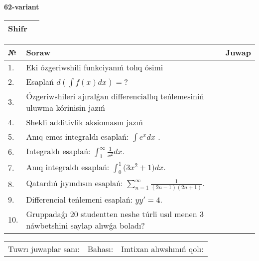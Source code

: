 \documentclass{article}
\begin{document}
  \egroup
  
  \newpage
  
  
  \textbf{62-variant}\\
  
  \bgroup
  \def\arraystretch{1.6} %
  
  \begin{tabular}{|m{5.7cm}|m{9.5cm}|}
  \hline
  Shifr & \\
  \hline
  \end{tabular}
  
  \vspace{1cm}
  
  \begin{tabular}{|m{0.7cm}|m{10cm}|m{4cm}|}
  \hline
  № & Soraw & Juwap \\
  \hline
  1. & Eki ózgeriwshili funkciyanıń tolıq ósimi &  \\
  \hline
  2. & Esaplań \(d\left( \int{f(x)dx} \right) = ?\) &  \\
  \hline
  3. & Ózgeriwshileri ajıralǵan differenciallıq teńlemesiniń uluwma kórinisin jazıń &  \\
  \hline
  4. & Shekli additivlik aksiomasın jazıń &  \\
  \hline
  5. & Anıq emes integraldı esaplań: \(\int{e^{x}dx}\) . &  \\
  \hline
  6. & Integraldı esaplań: \(\int_{1}^{\infty}{\frac{1}{x^2 }dx}\). &  \\
  \hline
  7. & Anıq integraldı esaplań: \(\int_{0}^{1}{(3x^2 } + 1)dx\). &  \\
  \hline
  8. & Qatardıń jıyındısın esaplań: \(\sum_{n = 1}^{\infty}\frac{1}{(2n - 1)(2n + 1)}\). &  \\
  \hline
  9. & Differencial teńlemeni esaplań: \(yy' = 4\). &  \\
  \hline
  10. & Gruppadaǵı 20 studentten neshe túrli usıl menen 3 náwbetshini saylap alıwǵa boladı? &  \\
  \hline
  \end{tabular}
  
  \vspace{1cm}
  
  \begin{tabular}{lll}
  Tuwrı juwaplar sanı: \underline{\hspace{1.5cm}} & 
  Bahası: \underline{\hspace{1.5cm}} & 
  Imtixan alıwshınıń qolı: \underline{\hspace{2cm}} \\
  \end{tabular}
  
\end{document}
